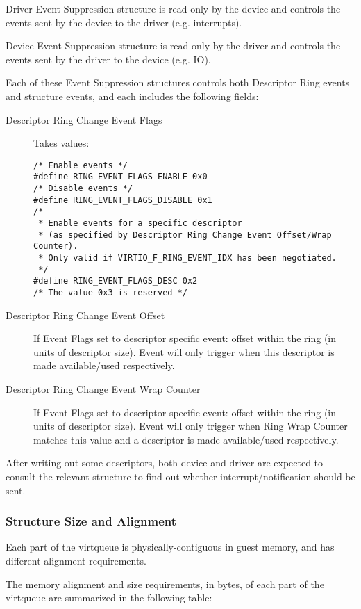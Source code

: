 Driver Event Suppression structure is read-only by the
device and controls the events sent by the device
to the driver (e.g. interrupts).

Device Event Suppression structure is read-only by
the driver and controls the events sent by the driver
to the device (e.g. IO).

Each of these Event Suppression structures controls
both Descriptor Ring events and structure events, and
each includes the following fields:

\begin{description}
\item [Descriptor Ring Change Event Flags] Takes values:
\begin{lstlisting}
/* Enable events */
#define RING_EVENT_FLAGS_ENABLE 0x0
/* Disable events */
#define RING_EVENT_FLAGS_DISABLE 0x1
/*
 * Enable events for a specific descriptor
 * (as specified by Descriptor Ring Change Event Offset/Wrap Counter).
 * Only valid if VIRTIO_F_RING_EVENT_IDX has been negotiated.
 */
#define RING_EVENT_FLAGS_DESC 0x2
/* The value 0x3 is reserved */
\end{lstlisting}
\item [Descriptor Ring Change Event Offset] If Event Flags set to descriptor
specific event: offset within the ring (in units of descriptor
size). Event will only trigger when this descriptor is
made available/used respectively.
\item [Descriptor Ring Change Event Wrap Counter] If Event Flags set to descriptor
specific event: offset within the ring (in units of descriptor
size). Event will only trigger when Ring Wrap Counter
matches this value and a descriptor is
made available/used respectively.
\end{description}

After writing out some descriptors, both device and driver
are expected to consult the relevant structure to find out
whether interrupt/notification should be sent.

\subsubsection{Structure Size and Alignment}
\label{sec:Packed Virtqueues / Structure Size and Alignment}

Each part of the virtqueue is physically-contiguous in guest memory,
and has different alignment requirements.

The memory alignment and size requirements, in bytes, of each part of the
virtqueue are summarized in the following table:

